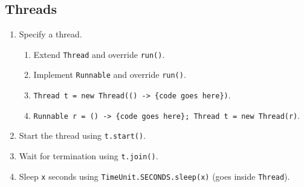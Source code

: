\documentclass[twocolumn,english]{article}
\begin{document}
\subsection{Threads}
\begin{enumerate}
\item Specify a thread.

\begin{enumerate}
\item Extend \texttt{Thread} and override \texttt{run()}.
\item Implement \texttt{Runnable} and override \texttt{run()}.
\item \texttt{Thread t = new Thread(() -\textgreater{} \{code goes here\})}.
\item \texttt{Runnable r = () -\textgreater{} \{code goes here\}; Thread
t = new Thread(r)}.
\end{enumerate}
\item Start the thread using \texttt{t.start()}.
\item Wait for termination using \texttt{t.join()}.
\item Sleep \texttt{x} seconds using \texttt{TimeUnit.SECONDS.sleep(x)}
(goes inside \texttt{Thread}).
\end{enumerate}
\end{document}
